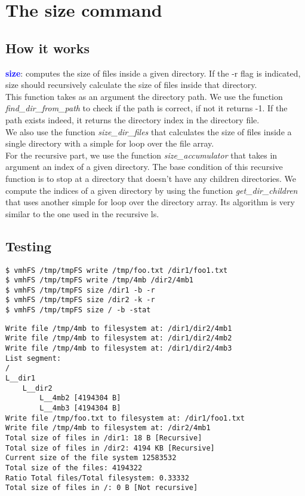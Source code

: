 \section{The size command}

\subsection{How it works}
\textcolor{blue}{\textbf{size}}: computes the size of files inside a given directory. If the -r flag is indicated, size should recursively calculate the size of files inside that directory. \\

This function takes as an argument the directory path. We use the function \textit{find\_dir\_from\_path} to check if the path is correct, if not it returns -1. If the path exists indeed, it returns the directory index in the directory file.\\

We also use the function \textit{size\_dir\_files} that calculates the size of files inside a single directory with a simple for loop over the file array.\\

For the recursive part, we use the function \textit{size\_accumulator} that takes in argument an index of a given directory. The base condition of this recursive function is to stop at a directory that doesn't have any children directories. We compute the indices of a given directory by using the function \textit{get\_dir\_children} that uses another simple for loop over the directory array. Its algorithm is very similar to the one used in the recursive ls.\\

\newpage
\subsection{Testing}
\begin{lstlisting}
$ vmhFS /tmp/tmpFS write /tmp/foo.txt /dir1/foo1.txt
$ vmhFS /tmp/tmpFS write /tmp/4mb /dir2/4mb1
$ vmhFS /tmp/tmpFS size /dir1 -b -r
$ vmhFS /tmp/tmpFS size /dir2 -k -r
$ vmhFS /tmp/tmpFS size / -b -stat
\end{lstlisting}

\begin{lstlisting}
Write file /tmp/4mb to filesystem at: /dir1/dir2/4mb1
Write file /tmp/4mb to filesystem at: /dir1/dir2/4mb2
Write file /tmp/4mb to filesystem at: /dir1/dir2/4mb3
List segment:
/
L__dir1
    L__dir2
        L__4mb2 [4194304 B]
        L__4mb3 [4194304 B]
Write file /tmp/foo.txt to filesystem at: /dir1/foo1.txt
Write file /tmp/4mb to filesystem at: /dir2/4mb1
Total size of files in /dir1: 18 B [Recursive]
Total size of files in /dir2: 4194 KB [Recursive]
Current size of the file system 12583532
Total size of the files: 4194322
Ratio Total files/Total filesystem: 0.33332
Total size of files in /: 0 B [Not recursive]
\end{lstlisting}

\newpage



